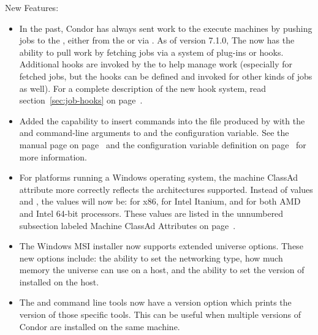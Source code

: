\noindent New Features:

\begin{itemize}

\item In the past, Condor has always sent work to the execute machines
  by pushing jobs to the , either from the
   or via .
  As of version 7.1.0, The  now has the ability to pull
  work by fetching jobs via a system of plug-ins or hooks.
  Additional hooks are invoked by the  to help manage
  work (especially for fetched jobs, but the  hooks
  can be defined and invoked for other kinds of jobs as well).
  For a complete description of the new hook system, read
  section~\ref{sec:job-hooks} on page~\pageref{sec:job-hooks}.

\item Added the capability to insert commands into the 
  file produced by  with the  and
   command-line arguments to  and
  the  configuration variable.
  See the  manual page on
  page~\pageref{man-condor-submit-dag}
  and the configuration variable definition on
  page~\pageref{param:DAGManInsertSubFile} for more information.

\item For platforms running a Windows operating system, the 
  machine ClassAd attribute more correctly reflects the architectures
  supported.  Instead of values  and ,
  the values will now be:  for x86,
   for Intel Itanium,
  and  for both AMD and Intel 64-bit processors.
  These values are listed in the unnumbered subsection labeled
  Machine ClassAd Attributes on page~\pageref{sec:Machine-ClassAd-Attributes}.

\item The Windows MSI installer now supports extended  universe 
  options. These new options include: the ability to set the 
  networking type, how much memory the  universe can use 
  on a host, and
  the ability to set the version of  installed on the host.

\item The  and  command line tools now have a
  version option which prints the version of those specific tools.  This
  can be useful when multiple versions of Condor are installed on the
  same machine.


\end{itemize}
